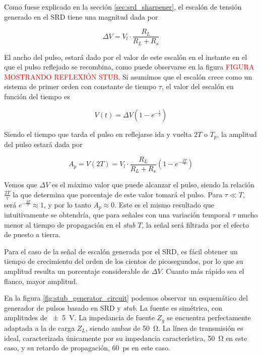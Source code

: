 Como fuese explicado en la sección \ref{sec:srd_sharpener}, el escalón de tensión generado en el SRD tiene una magnitud dada por

\begin{equation}
    \Delta V = V_l \cdot \frac{R_L}{R_L+R_s}
\end{equation}

El ancho del pulso, estará dado por el valor de este escalón en el instante en
el que el pulso reflejado se recombina, como puede observarse en la figura
\textcolor{red}{FIGURA MOSTRANDO REFLEXIÓN STUB}. Si asumimos que el escalón
crece como un sistema de primer orden con constante de tiempo $\tau$, el valor
del escalón en función del tiempo es

\begin{equation}
  V(t) = \Delta V \left( 1-e^{-\frac{t}{\tau}}\right)
\end{equation}

Siendo el tiempo que tarda el pulso en reflejarse ida y vuelta $2T$ o $T_p$, la
amplitud del pulso estará dada por

\begin{equation}
    \label{eq:A_p}
    A_p = V(2T) = V_l \cdot \frac{R_L}{R_L+R_s} \left( 1-e^{-\frac{2T}{\tau}}\right)
\end{equation}

Vemos que $\Delta V$ es el máximo valor que puede alcanzar el pulso, siendo la
relación $\frac{2T}{\tau}$ la que determina que porcentaje de este valor tomará
el pulso. Para $ \tau \ll T $, será $e^{-\frac{2T}{\tau}} \approx 1$, y por lo
tanto $A_p \approx 0$. Este es el mismo resultado que intuitivamente se
obtendría, que para señales con una variación temporal $\tau$ mucho menor al
tiempo de propagación en el \textit{stub} $T$, la señal será filtrada por el
efecto de puesto a tierra.

Para el caso de la señal de escalón generada por el SRD, es fácil obtener un
tiempo de crecimiento del orden de los cientos de picosegundos, por lo que su
amplitud resulta un porcentaje considerable de $\Delta V$. Cuanto más rápido sea
el flanco, mayor amplitud.

En la figura \ref{fig:stub_generator_circuit} podemos observar un esquemático
del generador de pulsos basado en SRD y \textit{stub}. La fuente es simétrica,
con amplitudes de \qty{\pm 5}{\volt}. La impedancia de fuente $Z_g$ se encuentra
perfectamente adaptada a la de carga $Z_L$, siendo ambas de \qty{50}{\ohm}. La
línea de transmisión es ideal, caracterizada únicamente por su impedancia
característica, \qty{50}{\ohm} en este caso, y su retardo de propagación,
\qty{60}{\pico\second} en este caso.

